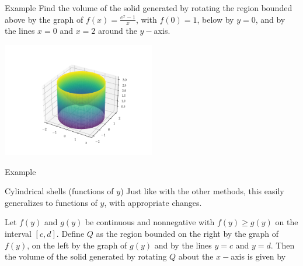 \documentclass[presentation]{beamer}
\begin{document}
\begin{frame}[label={sec:org2ce0d50}]{Example}
Find the volume of the solid generated by rotating the region bounded
above by the graph of \(f \left( x \right) = \frac{e^x-1}{x}\), with
\(f \left( 0 \right) = 1\), below by \(y = 0\), and by the lines \(x
= 0\) and \(x = 2\) around the \(y-\)axis.

\begin{center}
\includegraphics[width=0.5\textwidth]{../img/day008-ex03.png}
\end{center}
\end{frame}

\begin{frame}[label={sec:orgde2ff55}]{Example}
\end{frame}

\begin{frame}[label={sec:orgc53ae29}]{Cylindrical shells (functions of \(y\))}
Just like with the other methods, this easily generalizes to functions
of \(y\), with appropriate changes.
\begin{theorem}
Let \(f \left( y \right)\) and \(g \left( y \right)\) be continuous
and nonnegative with \(f \left( y \right) \ge g \left( y \right)\) on
the interval \(\left[ c,d \right]\).  Define \(Q\) as the region
bounded on the right by the graph of \(f \left( y \right)\), on the left by the
graph of \(g \left( y \right)\) and by the lines \(y=c\) and \(y=d\). Then the volume of the solid generated by rotating \(Q\) about the
\(x-\)axis is given by
\[
 \]
 \phantom{butts}

\phantom{butts}
\end{theorem}
\end{frame}
\end{document}
